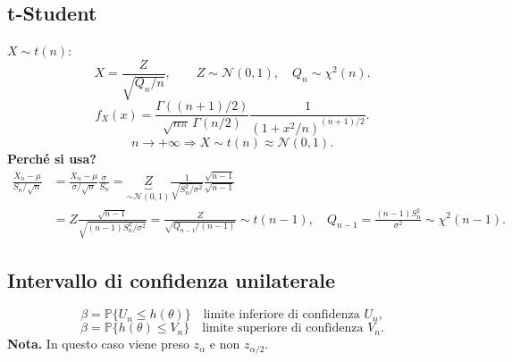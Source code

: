 \subsection*{t-Student}
$X\sim t(n)$:
\[X=\frac Z{\sqrt{Q_n/n}},\qquad Z\sim\mathcal N(0,1),\quad Q_n\sim\chi^2(n).\]
\[\boxed{f_X(x)=\frac{\Gamma((n+1)/2)}{\sqrt{n\pi}\,\Gamma(n/2)}\frac1{(1+x^2/n)^{(n+1)/2}}}.\]
\[n\to+\infty\Rightarrow X\sim t(n)\approx\mathcal N(0,1).\]
\textbf{Perché si usa?}
\begin{align*}
\frac{\overline X_n-\mu}{S_n/\sqrt n}&=\frac{\overline X_n-\mu}{\sigma/\sqrt n}\frac\sigma{S_n}
=\underbrace{Z}_{\sim\mathcal N(0,1)}\frac1{\sqrt{S_n^2/\sigma^2}}\frac{\sqrt{n-1}}{\sqrt{n-1}}\\
&=Z\frac{\sqrt{n-1}}{\sqrt{(n-1)S_n^2/\sigma^2}}
=\frac Z{\sqrt{Q_{n-1}/(n-1)}}\sim t(n-1),\quad Q_{n-1}=\frac{(n-1)S_n^2}{\sigma^2}\sim\chi^2(n-1).
\end{align*}
\subsection*{Intervallo di confidenza unilaterale}
\[\boxed{\beta=\mathbb P\{U_n\le h(\theta)\}}\quad\text{limite inferiore di confidenza }U_n,\]
\[\boxed{\beta=\mathbb P\{h(\theta)\le V_n\}}\quad\text{limite superiore di confidenza }V_n.\]
\textbf{Nota.} In questo caso viene preso $z_\alpha$ e non $z_{\alpha/2}$.
